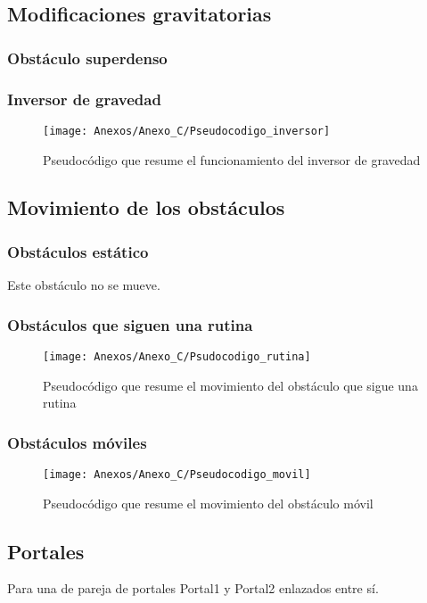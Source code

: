 \subsection{Modificaciones gravitatorias}
\subsubsection{Obstáculo superdenso}

\subsubsection{Inversor de gravedad}

\begin{figure}[h]
\centering
\texttt{[image: Anexos/Anexo\_C/Pseudocodigo\_inversor]}
\caption{Pseudocódigo que resume el funcionamiento del inversor de gravedad}
\end{figure}

\subsection{Movimiento de los obstáculos}
\subsubsection{Obstáculos estático}
Este obstáculo no se mueve.

\clearpage
\subsubsection{Obstáculos que siguen una rutina}

\begin{figure}[h]
\centering
\texttt{[image: Anexos/Anexo\_C/Psudocodigo\_rutina]}
\caption{Pseudocódigo que resume el movimiento del obstáculo que sigue una rutina}
\end{figure}

\subsubsection{Obstáculos móviles}

\begin{figure}[h]
\centering
\texttt{[image: Anexos/Anexo\_C/Pseudocodigo\_movil]}
\caption{Pseudocódigo que resume el movimiento del obstáculo móvil}
\end{figure}

\subsection{Portales}
Para una de pareja de portales Portal1 y Portal2 enlazados entre sí.

